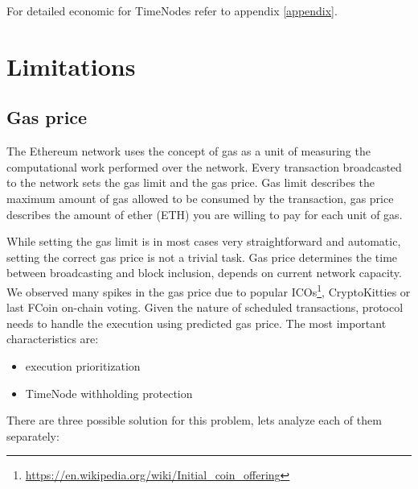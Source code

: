 \documentclass{report}
\begin{document}
  For detailed economic for TimeNodes refer to appendix \ref{appendix}.
  \section{Limitations}
  \subsection{Gas price}
  The Ethereum network uses the concept of gas as a unit of measuring the computational work performed over the network. Every transaction broadcasted to the network sets the gas limit and the gas price. Gas limit describes the maximum amount of gas allowed to be consumed by the transaction, gas price describes the amount of ether (ETH) you are willing to pay for each unit of gas.

  While setting the gas limit is in most cases very straightforward and automatic, setting the correct gas price is not a trivial task. Gas price determines the time between broadcasting and block inclusion, depends on current network capacity. We observed many spikes in the gas price due to popular ICOs\footnote{\url{https://en.wikipedia.org/wiki/Initial_coin_offering}}, CryptoKitties or last FCoin on-chain voting.
Given the nature of scheduled transactions, protocol needs to handle the execution using predicted gas price. The most important characteristics are:
  \begin{itemize}
    \item execution prioritization
    \item TimeNode withholding protection
  \end{itemize}

  There are three possible solution for this problem, lets analyze each of them separately:
\end{document}
